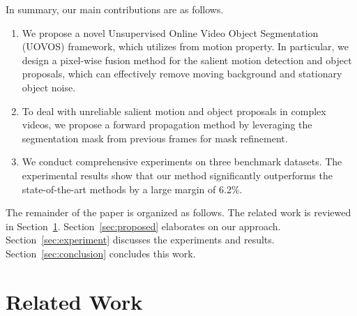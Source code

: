 \documentclass[journal]{IEEEtran}
\begin{document}
In summary, our main contributions are as follows.
\begin{enumerate}
	\item We propose a novel Unsupervised Online Video Object Segmentation (UOVOS) framework, which utilizes from motion property. In particular, we design a pixel-wise fusion method for the salient motion detection and object proposals, which can effectively remove moving background and stationary object noise.	
	\item To deal with unreliable salient motion and object proposals in complex videos, we propose a forward propagation method by leveraging the segmentation mask from previous frames for mask refinement.
	\item We conduct comprehensive experiments on three benchmark datasets. The experimental results show that our method significantly outperforms the state-of-the-art methods by a large margin of 6.2\%. 
\end{enumerate}

The remainder of the paper is organized as follows.
The related work is reviewed in Section~\ref{sec:relatedwork}.
Section~\ref{sec:proposed} elaborates on our approach. 
Section~\ref{sec:experiment} discusses the experiments and results. 
Section~\ref{sec:conclusion} concludes this work.

 \section{Related Work}
\label{sec:relatedwork}
\end{document}
